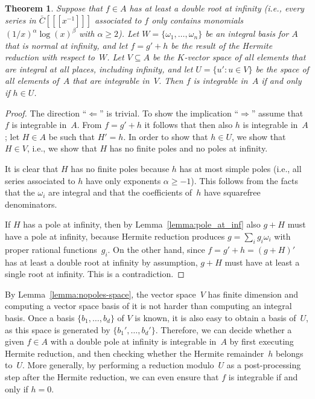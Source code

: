 \documentclass{sig-alternate}
\newtheorem{theorem}{Theorem}
\begin{document}
\begin{theorem}\label{thm:intiff0}
  Suppose that $f\in A$ has at least a double root at infinity (i.e., every
  series in $\bar C[[[x^{-1}]]]$ associated to $f$ only contains monomials
  $(1/x)^\alpha\log(x)^\beta$ with $\alpha\geq2$).
  Let $W=\{\omega_1,\dots,\omega_n\}$ be an integral basis for $A$ that is normal at infinity,
  and let $f=g'+h$ be the  result of the Hermite reduction with respect to~$W$.
  Let $V\subseteq A$ be the $K$-vector space of all elements that are integral at all places,
  including infinity, and let $U=\{u':u\in V\}$ be the space of all elements of~$A$
  that are integrable in~$V$.
  Then $f$ is integrable in~$A$ if and only if $h\in U$.
\end{theorem}

\begin{proof}
The direction ``$\Leftarrow$'' is trivial. To show the implication
``$\Rightarrow$'' assume that $f$ is integrable in~$A$. From $f=g'+h$ it follows that
then also $h$ is integrable in~$A$; let $H\in A$ be such that $H'=h$.  In order to show
that $h\in U$, we show that $H\in V$, i.e., we show that $H$ has no finite poles and
no poles at infinity.

It is clear that $H$ has no finite poles because $h$ has at most simple poles
(i.e., all series associated to $h$ have only exponents $\alpha\geq-1$).
This follows from the facts that the $\omega_i$ are integral and that
the coefficients of~$h$ have squarefree denominators.

If $H$ has a pole at infinity, then by Lemma~\ref{lemma:pole_at_inf} also
$g+H$ must have a pole at infinity, because Hermite reduction produces
$g=\sum_i g_i\omega_i$ with proper rational functions~$g_i$.  On the other
hand, since $f=g'+h=(g+H)'$ has at least a double root at infinity by
assumption, $g+H$ must have at least a single root at infinity. This is
a contradiction.
\end{proof}

By Lemma~\ref{lemma:nopoles-space}, the vector space~$V$ has finite dimension and computing a
vector space basis of it is not harder than computing an integral basis. Once
a basis $\{b_1,\dots,b_d\}$ of $V$ is known, it is also easy to obtain a basis
of~$U$, as this space is generated by $\{b_1',\dots,b_d'\}$. Therefore, we
can decide whether a given $f\in A$ with a double pole at infinity is integrable in~$A$
by first executing Hermite reduction, and then checking whether the Hermite
remainder~$h$ belongs to~$U$. More generally, by performing a reduction modulo~$U$
as a post-processing step after the Hermite reduction, we can even ensure that $f$
is integrable if and only if $h=0$.
\end{document}
